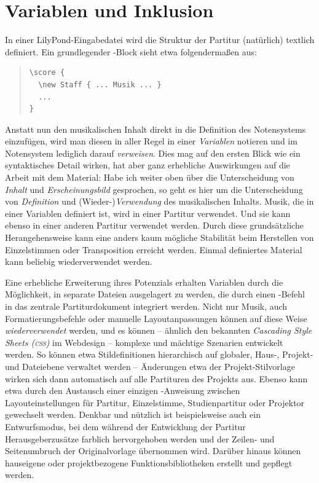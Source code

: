 \documentclass[DIV=12]{scrreprt}
\begin{document}
\section{Variablen und Inklusion}
\label{sec:pt_variables-includes}
In einer LilyPond-Eingabedatei wird die Struktur der Partitur (natürlich) textlich definiert.
Ein grundlegender -Block sieht etwa folgendermaßen aus:

\begin{quote}
\begin{minipage}{\textwidth}
\begin{verbatim}
\score {
  \new Staff { ... Musik ... }
  ...
}
\end{verbatim}
\end{minipage}
\end{quote}

Anstatt nun den musikalischen Inhalt direkt in die Definition des Notensystems einzufügen, wird man diesen in aller Regel in einer \emph{Variablen} notieren und im Notensystem lediglich darauf \emph{verweisen}.
Dies mag auf den ersten Blick wie ein syntaktisches Detail wirken, hat aber ganz erhebliche Auswirkungen auf die Arbeit mit dem Material:
Habe ich weiter oben über die Unterscheidung von \emph{Inhalt} und \emph{Erscheinungsbild} gesprochen, so geht es hier um die Unterscheidung von \emph{Definition} und (Wieder-)\emph{Verwendung} des musikalischen Inhalts.
Musik, die in einer Variablen definiert ist, wird in einer Partitur verwendet.
Und sie kann ebenso in einer anderen Partitur verwendet werden.
Durch diese grundsätzliche Herangehensweise kann eine anders kaum mögliche Stabilität beim Herstellen von Einzelstimmen oder Transposition erreicht werden.
Einmal definiertes Material kann beliebig wiederverwendet werden.

\bigskip
Eine erhebliche Erweiterung ihres Potenzials erhalten Variablen durch die Möglichkeit, in separate Dateien ausgelagert zu werden, die durch einen -Befehl in das zentrale Partiturdokument integriert werden.
Nicht nur Musik, auch Formatierungsbefehle oder manuelle Layoutanpassungen können auf diese Weise \emph{wiederverwendet} werden, und es können -- ähnlich den bekannten \emph{Cascading Style Sheets (\textsc{css})} im Webdesign -- komplexe und mächtige Szenarien entwickelt werden.
So können etwa Stildefinitionen hierarchisch auf globaler, Haus-, Projekt- und Dateiebene verwaltet werden -- Änderungen etwa der Projekt-Stilvorlage wirken sich dann automatisch auf alle Partituren des Projekts aus.
Ebenso kann etwa durch den Austausch einer einzigen -Anweisung zwischen Layouteinstellungen für Partitur, Einzelstimme, Studienpartitur oder Projektor gewechselt werden.
Denkbar und nützlich ist beispielsweise auch ein Entwurfsmodus, bei dem während der Entwicklung der Partitur Herausgeberzusätze farblich hervorgehoben werden und der Zeilen- und Seitenumbruch der Originalvorlage übernommen wird.
Darüber hinaus können hauseigene oder projektbezogene Funktionsbibliotheken erstellt und gepflegt werden.
\end{document}
